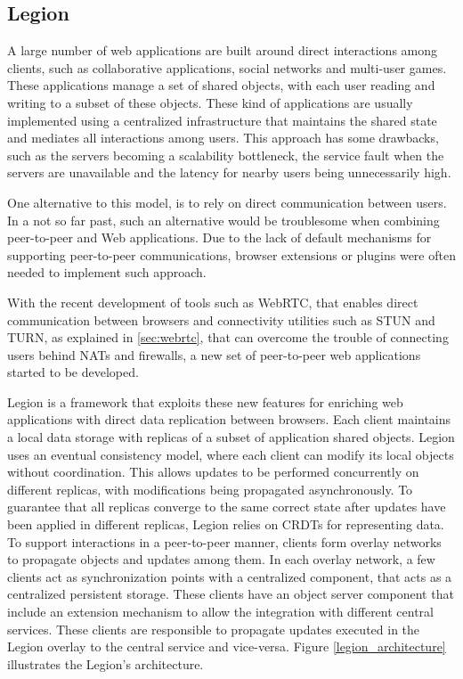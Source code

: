 \subsection{Legion}
\label{sec:legion_intro}
A large number of web applications are built around direct interactions among clients, such as collaborative applications, social networks and multi-user games. These applications manage a set of shared objects, with each user reading and writing to a subset of these objects. These kind of applications are usually implemented using a centralized infrastructure that maintains the shared state and mediates all interactions among users. This approach has some drawbacks, such as the servers becoming a scalability bottleneck, the service fault when the servers are unavailable and the latency for nearby users being unnecessarily high.\par
	One alternative to this model, is to rely on direct communication between users. In a not so far past, such an alternative would be troublesome when combining peer-to-peer and Web applications. Due to the lack of default mechanisms for supporting peer-to-peer communications, browser extensions or plugins were often needed  to implement such approach.\par
	With the recent development of tools such as WebRTC\cite{webrtc}, that enables direct communication between browsers and connectivity utilities such as STUN and TURN, as explained in \ref{sec:webrtc}, that can overcome the trouble of connecting users behind NATs and firewalls, a new set of peer-to-peer web applications started to be developed.\par
	Legion is a framework that exploits these new features for enriching web applications with direct data replication between browsers. Each client maintains a local data storage with replicas of a subset of application shared objects. Legion uses an eventual consistency model, where each client can modify its local objects without coordination. This allows updates to be performed concurrently on different replicas, with modifications being propagated asynchronously. To guarantee that all replicas converge to the same correct state after updates have been applied in different replicas, Legion relies on CRDTs\cite{crdt} for representing data. To support interactions in a peer-to-peer manner, clients form overlay networks to propagate objects and updates among them. In each overlay network, a few clients act as synchronization points with a centralized component, that acts as a centralized persistent storage. These clients have an object server component that include an extension mechanism to allow the integration with different central services. These clients are responsible to propagate updates executed in the Legion overlay to the central service and vice-versa. Figure \ref{legion_architecture} illustrates the Legion's architecture.
	
